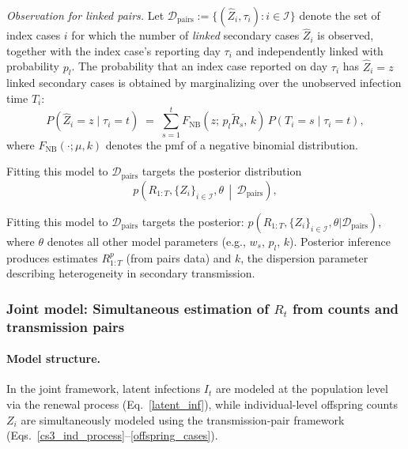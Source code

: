 \documentclass{article}
\begin{document}
\emph{Observation for linked pairs.} Let $\mathcal{D}_{\mathrm{pairs}}:=\{(\widehat{Z}_i, \tau_i): i\in\mathcal{I}\}$ denote the set of index cases $i$ for which the number of \emph{linked} secondary cases $\widehat{Z}_i$ is observed, together with the index case’s reporting day $\tau_i$ and independently linked with probability $p_l$. The probability that an index case reported on day $\tau_i$ has $\widehat{Z}_i=z$ linked secondary cases is obtained by marginalizing over the unobserved infection time $T_i$:  
\begin{equation}
    P(\widehat{Z}_i=z \mid \tau_i=t) \;=\; \sum_{s=1}^{t} F_{\mathrm{NB}}\!\left(z;\, p_l \tilde{R}_s,\, k\right) \, P(T_i=s \mid \tau_i=t),
\end{equation}
where $F_{\mathrm{NB}}(\cdot;\mu,k)$ denotes the pmf of a negative binomial distribution.


Fitting this model to $\mathcal{D}_{\mathrm{pairs}}$ targets the posterior distribution
\begin{equation}
    p\!\left(R_{1:T}, \{Z_i\}_{i\in\mathcal{I}}, \theta \,\middle|\, \mathcal{D}_{\mathrm{pairs}}\right),
\end{equation}

Fitting this model to $\mathcal{D}_{\mathrm{pairs}}$ targets the posterior: $\label{cs3_post_pairs}
p\left(R_{1:T}, \{Z_i\}_{i\in\mathcal{I}},\theta |\mathcal{D}_{\text{pairs}}\right)$, where $\theta$ denotes all other model parameters (e.g., $w_s$, $p_l$, $k$).  Posterior inference produces estimates $R_{1:T}^p$ (from pairs data) and $k$, the dispersion parameter describing heterogeneity in secondary transmission.

\subsubsection{Joint model: Simultaneous estimation of $R_{t}$ from counts and transmission pairs}

\paragraph{Model structure.}
In the joint framework, latent infections $I_t$ are modeled at the population level via the renewal process (Eq.~\eqref{latent_inf}), while individual-level offspring counts $Z_i$ are simultaneously modeled using the transmission-pair framework (Eqs.~\eqref{cs3_ind_process}--\eqref{offspring_cases}).  
\end{document}
